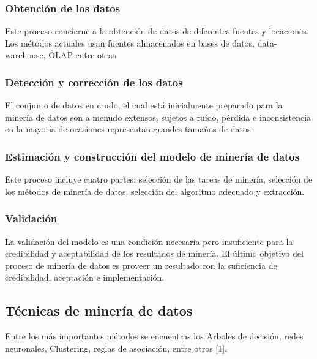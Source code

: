 \subsubsection{Obtención de los datos}
Este proceso concierne a la obtención de datos de diferentes fuentes y locaciones. Los métodos actuales usan fuentes almacenados en bases de datos, data-warehouse, OLAP entre otras.
\subsubsection{Detección y corrección de los datos}
El conjunto de datos en crudo, el cual está inicialmente preparado para la minería de datos son a menudo extensos, sujetos a ruido, pérdida e inconsistencia en la mayoría de ocasiones representan  grandes tamaños de datos.
\subsubsection{Estimación y construcción del modelo de minería de datos}
Este proceso incluye cuatro partes: selección de las tareas de minería, selección de los métodos de minería de datos, selección del algoritmo adecuado y extracción.
\subsubsection{Validación}
La validación del modelo es una condición necesaria pero insuficiente para la credibilidad y aceptabilidad de los resultados de minería. El último objetivo del proceso de minería de datos es proveer un resultado con la suficiencia de credibilidad, aceptación e implementación.
\subsection{Técnicas de minería de datos}
Entre los más importantes métodos se encuentras los Arboles de decisión, redes neuronales, Clustering, reglas de asociación, entre otros [1].

 
